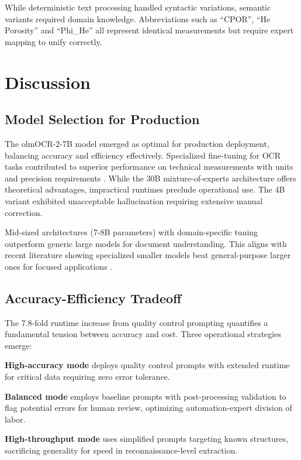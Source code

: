 \documentclass[conference]{IEEEtran}
\begin{document}
While deterministic text processing handled syntactic variations, semantic variants required domain knowledge. Abbreviations such as ``CPOR'', ``He Porosity'' and ``Phi\_He'' all represent identical measurements but require expert mapping to unify correctly.

\section{Discussion}

\subsection{Model Selection for Production}

The olmOCR-2-7B model emerged as optimal for production deployment, balancing accuracy and efficiency effectively. Specialized fine-tuning for OCR tasks contributed to superior performance on technical measurements with units and precision requirements \cite{e2e2025}. While the 30B mixture-of-experts architecture offers theoretical advantages, impractical runtimes preclude operational use. The 4B variant exhibited unacceptable hallucination requiring extensive manual correction.

Mid-sized architectures (7-8B parameters) with domain-specific tuning outperform generic large models for document understanding. This aligns with recent literature showing specialized smaller models beat general-purpose larger ones for focused applications \cite{yang2024}.

\subsection{Accuracy-Efficiency Tradeoff}

The 7.8-fold runtime increase from quality control prompting quantifies a fundamental tension between accuracy and cost. Three operational strategies emerge:

\textbf{High-accuracy mode} deploys quality control prompts with extended runtime for critical data requiring zero error tolerance.

\textbf{Balanced mode} employs baseline prompts with post-processing validation to flag potential errors for human review, optimizing automation-expert division of labor.

\textbf{High-throughput mode} uses simplified prompts targeting known structures, sacrificing generality for speed in reconnaissance-level extraction.
\end{document}

